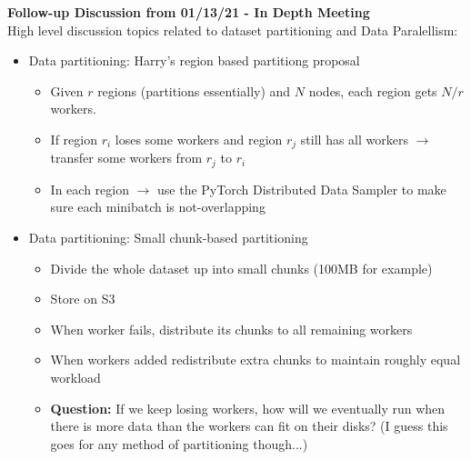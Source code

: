 \vspace{2em}
\textbf{Follow-up Discussion from 01/13/21 - In Depth Meeting} \\
High level discussion topics related to dataset partitioning and Data Paralellism:
\begin{itemize}
    \item Data partitioning: Harry's region based partitiong proposal
    \begin{itemize}
        \item Given $r$ regions (partitions essentially) and $N$ nodes, each
          region gets $N/r$ workers.
        \item If region $r_i$ loses some workers and region $r_j$ still has all
          workers $\rightarrow$ transfer some workers from $r_j$ to $r_i$
        \item In each region $\rightarrow$ use the PyTorch Distributed Data Sampler
          to make sure each minibatch is not-overlapping
    \end{itemize}

    \item Data partitioning: Small chunk-based partitioning
    \begin{itemize}
        \item Divide the whole dataset up into small chunks (100MB for example)
        \item Store on S3
        \item When worker fails, distribute its chunks to all remaining workers
        \item When workers added redistribute extra chunks to maintain roughly equal
          workload
        \item \textbf{Question:} If we keep losing workers, how will we eventually run
          when there is more data than the workers can fit on their disks? (I guess
          this goes for any method of partitioning though...)
    \end{itemize}
\end{itemize}


